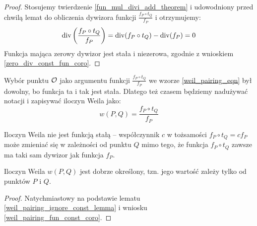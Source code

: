 \begin{proof}
Stosujemy twierdzenie \ref{fun_mul_divi_add_theorem}
i udowodniony przed chwilą lemat
do obliczenia dywizora funkcji $\frac{f_P \circ t_Q}{f_P}$
i otrzymujemy:
\begin{equation*}
\operatorname{div}\left(\frac{f_P \circ t_Q}{f_P}\right) =
\operatorname{div}(f_P \circ t_Q) - \operatorname{div}(f_P) = 0
\end{equation*}
Funkcja mająca zerowy dywizor jest stała i niezerowa,
zgodnie z wnioskiem \ref{zero_div_const_fun_coro}.
\end{proof}

\begin{remark}
Wybór punktu $\mathcal{O}$ jako argumentu funkcji $\frac{f_P \circ t_Q}{f_P}$
we wzorze \ref{weil_pairing_eqn} był dowolny,
bo funkcja ta i tak jest stała.
Dlatego też czasem będziemy nadużywać notacji i zapisywać
iloczyn Weila jako:
\begin{equation*}
w(P, Q) = \frac{f_P \circ t_Q}{f_P}
\end{equation*}
\end{remark}

\begin{remark}
Iloczyn Weila nie jest funkcją stałą --
współczynnik $c$ w tożsamości $f_P \circ t_Q = cf_P$
może zmieniać się w zależności od punktu $Q$ mimo tego,
że funkcja $f_P \circ t_Q$ zawsze ma taki sam dywizor jak funkcja $f_P$.
\end{remark}

\begin{theorem}
Iloczyn Weila $w(P, Q)$ jest dobrze określony,
tzn. jego wartość zależy tylko od punktów $P$ i $Q$.
\end{theorem}

\begin{proof}
Natychmiastowy na podstawie
lematu \ref{weil_pairing_ignore_const_lemma}
i wniosku \ref{weil_pairing_fun_const_coro}.
\end{proof}
